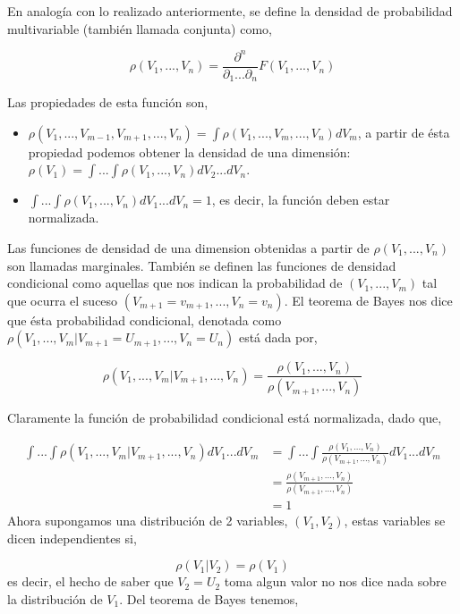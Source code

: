 \documentclass[executivepaper,12pt]{article}
\numberwithin{equation}{section}
\begin{document}
En analogía con lo realizado anteriormente, se define la densidad de probabilidad multivariable (también llamada conjunta) como,

\begin{equation}
	\rho(V_1,...,V_n)=\frac{\partial^n}{\partial_1...\partial_n} F(V_1,...,V_n)
\end{equation}

Las propiedades de esta función son,

\begin{itemize}
	\item $\rho(V_1,...,V_{m-1},V_{m+1},...,V_n)=\int \rho(V_1,...,V_m,...,V_n) dV_m$, a partir de ésta propiedad podemos obtener la densidad de una dimensión: $\rho(V_1)=\int...\int \rho(V_1,...,V_n) dV_2...dV_n $. 
	\item $\int... \int \rho(V_1,...,V_n) dV_1...dV_n=1$, es decir, la función deben estar normalizada.
\end{itemize}

Las funciones de densidad de una dimension obtenidas a partir de $\rho(V_1,...,V_n)$ son llamadas marginales. También se definen las funciones de densidad condicional como aquellas que nos indican la probabilidad de $(V_1,...,V_{m})$ tal que ocurra el suceso $(V_{m+1}=v_{m+1},...,V_{n}=v_n)$. El teorema de Bayes nos dice que ésta probabilidad condicional, denotada como $\rho(V_1,...,V_{m}\rvert V_{m+1}=U_{m+1},...,V_{n}=U_n)$ está dada por,

\begin{equation}
	\rho(V_1,...,V_{m}\rvert V_{m+1},...,V_{n})=\frac{\rho(V_1,...,V_n)}{\rho(V_{m+1},...,V_{n})}
\end{equation} 

Claramente la función de probabilidad condicional está normalizada, dado que,

\begin{align*}
	\int...\int \rho(V_1,...,V_{m}\rvert V_{m+1},...,V_{n}) dV_1...dV_m&=\int...\int \frac{\rho(V_1,...,V_n)}{\rho(V_{m+1},...,V_{n})} dV_1...dV_m\\
	&=\frac{\rho(V_{m+1},...,V_n)}{\rho(V_{m+1},...,V_{n})}\\
	&=1
\end{align*}
Ahora supongamos una distribución de 2 variables, $(V_1,V_2)$, estas variables se dicen independientes si,

\begin{equation*}
	\rho(V_1 \rvert V_2)=\rho(V_1)
\end{equation*}
es decir, el hecho de saber que $V_2=U_2$ toma algun valor no nos dice nada sobre la distribución de $V_1$. Del teorema de Bayes tenemos,
\end{document}
